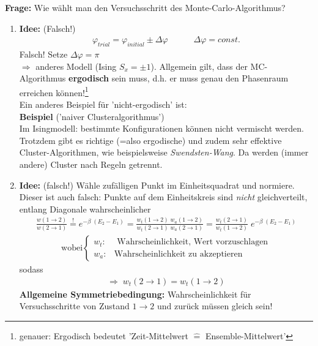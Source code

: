 \documentclass[12pt]{article}
\begin{document}
\textbf{Frage:} Wie wählt man den Versuchsschritt des Monte-Carlo-Algorithmus?
\begin{enumerate}

\item \textbf{Idee:} (Falsch!)
\begin{align*}
\varphi_{trial} = \varphi_{initial} \pm \Delta \varphi \quad \quad \quad \Delta \varphi = const.
\end{align*}
Falsch! Setze $\Delta \varphi = \pi$ \\
$ \Rightarrow$ anderes Modell (Ising $S_x = \pm 1$). Allgemein gilt, dass der MC-Algorithmus \textbf{ergodisch} sein muss, d.h. er muss genau den Phasenraum erreichen können!\footnote{genauer: Ergodisch bedeutet 'Zeit-Mittelwert $\widehat{=}$ Ensemble-Mittelwert'} \\
Ein anderes Beispiel für 'nicht-ergodisch' ist: \\
\textbf{Beispiel} ('naiver Clusteralgorithmus') \\
Im Isingmodell: bestimmte Konfigurationen können nicht vermischt werden. Trotzdem gibt es richtige (=also ergodische) und zudem sehr effektive Cluster-Algorithmen, wie beispielsweise \textit{Swendsten-Wang}. Da werden (immer andere) Cluster nach Regeln getrennt. 

\item \textbf{Idee:} (falsch!) Wähle zufälligen Punkt im Einheitsquadrat und normiere. %
Dieser ist auch falsch: Punkte auf dem Einheitskreis sind \textit{nicht} gleichverteilt, entlang Diagonale wahrscheinlicher
\begin{align*}
\frac{w(1 \to 2)}{w(2\to 1)} \overset{!}{=} e^{- \beta \; (E_2 - E_1)} = \frac{w_{t} (1 \to 2) \; w_{a} (1 \to 2)}{w_{t} (2 \to 1) \; w_{a} (2 \to 1) }  = \frac{w_t(2 \to 1)}{w_t(1 \to 2)} \; e^{-\beta \; (E_2-E_1)}
\end{align*}
\begin{align*}
\text{wobei} \begin{cases}
w_t: & \text{ Wahrscheinlichkeit, Wert vorzuschlagen} \\
w_a: & \text{Wahrscheinlichkeit zu akzeptieren}
\end{cases}
\end{align*}
sodass \begin{align*}
\Rightarrow \; w_t(2\to 1) = w_t(1 \to 2)
\end{align*}
\textbf{Allgemeine Symmetriebedingung:} Wahrscheinlichkeit für Versuchsschritte von Zustand $1 \to 2$ und zurück müssen gleich sein!


\end{enumerate}
\end{document}
